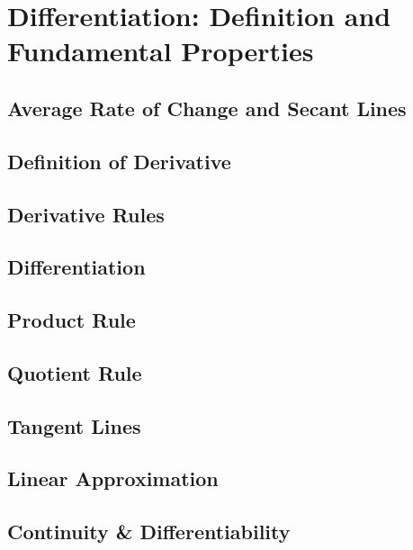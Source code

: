 \documentclass[../abcalc.tex]{subfiles}
\begin{document}
\chapter{Differentiation: Definition and Fundamental Properties}
\section{Average Rate of Change and Secant Lines}
\section{Definition of Derivative}
\section{Derivative Rules}
\section{Differentiation}
\section{Product Rule}
\section{Quotient Rule}
\section{Tangent Lines}
\section{Linear Approximation}
\section{Continuity \& Differentiability}
\end{document}
